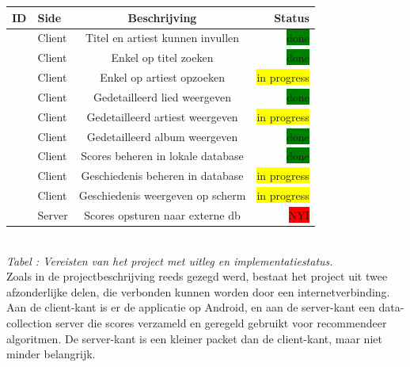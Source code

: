 \documentclass[11pt,a4paper]{article}
\newcommand{\boxgreen}{\colorbox{green}{\color{black}done}}
\newcommand{\boxyellow}{\colorbox{yellow}{\color{black}in progress}}
\newcommand{\boxred}{\colorbox{red}{\color{black}NYI}}
\newcounter{reqc}
\newcommand{\reqID} {%
   \stepcounter{reqc}%
   \thereqc}
\newcounter{tabc}
\newcommand{\tabID} {%
   \stepcounter{tabc}%
   \thetabc}
\begin{document}
	\begin{tabular}{| l | l | c | r |}
	\hline
	ID 		& 	Side	&	Beschrijving						& Status 		\\ \hline \hline
	\reqID	&	Client	&	Titel en artiest kunnen invullen	& \boxgreen 	\\ \hline
	\reqID 	&	Client	&	Enkel op titel zoeken				& \boxgreen		\\ \hline
	\reqID	& 	Client	&	Enkel op artiest opzoeken 			& \boxyellow	\\ \hline
	\reqID 	& 	Client	&	Gedetailleerd lied weergeven		& \boxgreen 	\\ \hline
	\reqID 	& 	Client	&	Gedetailleerd artiest weergeven		& \boxyellow 	\\ \hline
	\reqID 	& 	Client	&	Gedetailleerd album weergeven		& \boxgreen 	\\ \hline
	\reqID	& 	Client	&	Scores beheren in lokale database	& \boxgreen  	\\ \hline
	\reqID	& 	Client	&	Geschiedenis beheren in database	& \boxyellow  	\\ \hline
	\reqID	& 	Client	&	Geschiedenis weergeven op scherm	& \boxyellow  	\\ \hline
	\reqID	& 	Server	&	Scores opsturen naar externe db		& \boxred 		\\ \hline
	\end{tabular} \\ \newline
	\small \textit{Tabel \tabID : Vereisten van het project met uitleg en implementatiestatus.} \normalsize
	\\ \newline
	Zoals in de projectbeschrijving reeds gezegd werd, bestaat het project uit twee afzonderlijke delen, die verbonden kunnen worden door een internetverbinding. Aan de client-kant is er de applicatie op Android, en aan de server-kant een data-collection server die scores verzameld en geregeld gebruikt voor recommendeer algoritmen. De server-kant is een kleiner packet dan de client-kant, maar niet minder belangrijk. 
	\\ \newline
	
\end{document}
